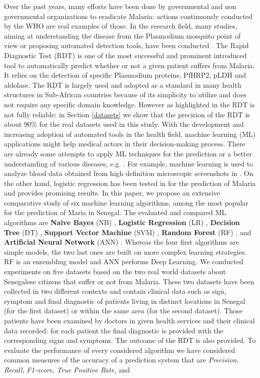Over the past years, many efforts have been done by governmental and non governmental organizations  to eradicate Malaria:  actions continuously conducted by the WHO are real examples of those.  In the research field, many studies, aiming at understanding the disease from the Plasmodium mosquito point of view or proposing automated detection tools, have been conducted \cite{Ga19,Le74,ermert2011development,Hu17}. The Rapid Diagnostic Test (RDT) \cite{Hu17} is one of the most successful and prominent introduced tool to automatically predict whether or not a given patient suffers from Malaria. It relies on the
detection of specific Plasmodium proteins, PfHRP2, pLDH
and aldolase. The RDT is largely used and adopted as a standard in many health structures in Sub-African countries because of its simplicity to utilize and does not require any specific domain knowledge. However as highlighted in \cite{Hu17} the RDT is not fully reliable:  in Section \ref{datasets} we show that the precision of the RDT is about 90\% for the real datasets used in this study.
With the development and increasing adoption of automated tools in the health field, machine learning  (ML) \cite{mitchell1997machine, Ug1} applications might help medical actors in their decision-making process. There are already some attempts to apply ML techniques for the prediction or a better understanding of various diseases, e.g. \cite{mbaye2019towards,gholami2017support}. For example, machine learning is used to analyze blood data obtained from high definition microscopic screenshots in \cite{gholami2017support}. On the other hand, logistic regression has been tested in \cite{mbaye2019towards} 
 for the prediction of Malaria and provides promising results.
 In this paper, we propose an  extensive comparative study of six machine learning algorithms, among the most popular for the prediction of Maria in Senegal. The evaluated and compared ML algorithms are \textbf{Naive Bayes} (NB) \cite{Ka17}, \textbf{Logistic Regression} (LR) \cite{Ph88},  \textbf{Decision Tree} (DT) \cite{Ro05}, \textbf{Support Vector Machine} (SVM) \cite{Ev01},
 \textbf{Random Forest} (RF) \cite{Be01},
 and \textbf{Artificial Neural Network} (ANN) \cite{Me19}. Whereas the four first algorithms are simple models, the two last ones are built on more complex learning strategies. RF is an ensembling model and ANN performs Deep Learning. We conducted experiments on five datasets based on the two real world datasets about Senegalese citizens that suffer or not from Malaria. These two datasets have been collected in two different contexts and contain clinical data such as sign, symptom and final diagnostic of patients living in distinct locations in Senegal (for the first dataset) or within the same area (for the second dataset). Those patients have been examined by doctors in given health services and their clinical data recorded: for each patient the final diagnostic is provided with the corresponding signs and symptoms. The outcome of the RDT is also provided. To evaluate the performance of every considered algorithm we have considered common measures of the accuracy of a prediction system that are \emph{Precision}, \emph{Recall}, \emph{F1-score}, \emph{True Positive Rate}, and
